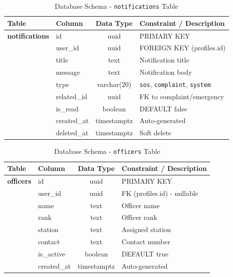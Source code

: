 \documentclass[12pt, a4paper, twoside]{report}
\begin{document}
\begin{table}[ht]
\centering
\caption{Database Schema - \texttt{notifications} Table}
\label{tab:notifications}
\begin{tabularx}{\textwidth}{p{3cm} p{3cm} c X}
\toprule
\textbf{Table} & \textbf{Column} & \textbf{Data Type} & \textbf{Constraint / Description} \\
\midrule
\textbf{notifications} & id & uuid & PRIMARY KEY \\
& user\_id & uuid & FOREIGN KEY (profiles.id) \\
& title & text & Notification title \\
& message & text & Notification body \\
& type & varchar(20) & \texttt{sos}, \texttt{complaint}, \texttt{system} \\
& related\_id & uuid & FK to complaint/emergency \\
& is\_read & boolean & DEFAULT false \\
& created\_at & timestamptz & Auto-generated \\
& deleted\_at & timestamptz & Soft delete \\
\bottomrule
\end{tabularx}
\end{table}

\begin{table}[ht]
\centering
\caption{Database Schema - \texttt{officers} Table}
\label{tab:officers}
\begin{tabularx}{\textwidth}{p{3cm} p{3cm} c X}
\toprule
\textbf{Table} & \textbf{Column} & \textbf{Data Type} & \textbf{Constraint / Description} \\
\midrule
\textbf{officers} & id & uuid & PRIMARY KEY \\
& user\_id & uuid & FK (profiles.id) - nullable \\
& name & text & Officer name \\
& rank & text & Officer rank \\
& station & text & Assigned station \\
& contact & text & Contact number \\
& is\_active & boolean & DEFAULT true \\
& created\_at & timestamptz & Auto-generated \\
\bottomrule
\end{tabularx}
\end{table}
\end{document}
